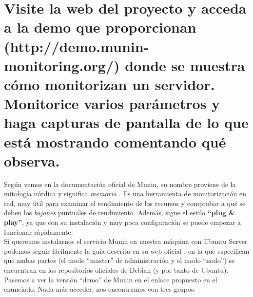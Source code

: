 \section{Visite la web del proyecto y acceda a la demo que proporcionan (http://demo.munin-monitoring.org/) donde se muestra cómo monitorizan un servidor. Monitorice varios parámetros y haga capturas de pantalla de lo que está mostrando comentando qué observa.}
Según vemos en la documentación oficial de Munin, su nombre proviene de la mitología nórdica y significa \emph{memoria} \cite{munin-info}. Es una herramienta de monitorización en red, muy útil para examinar el rendimiento de los recursos y comprobar a qué se deben los \emph{bajones} puntuales de rendimiento. Además, sigue el estilo \textbf{``plug \& play''}, ya que con su instalación y muy poca configuración se puede empezar a funcionar rápidamente. \\
Si queremos instalarnos el servicio Munin en nuestra máquina con Ubuntu Server podemos seguir fácilmente la guía descrita en su web oficial \cite{munin-install}, en la que especifican que ambas partes (el modo ``master'' de administración y el modo ``nodo'') se encuentran en los repositorios oficiales de Debian (y por tanto de Ubuntu). \\
Pasemos a ver la versión ``demo'' de Munin en el enlace propuesto en el enunciado. Nada más acceder, nos encontramos con tres grupos:
